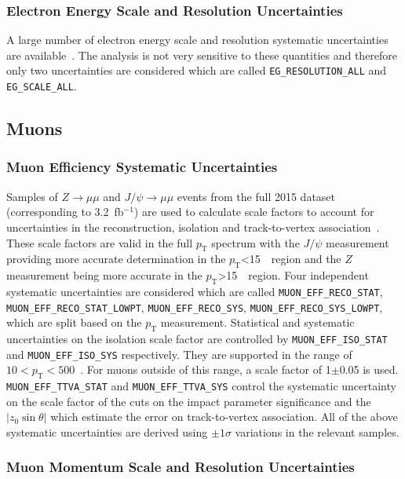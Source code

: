 \subsubsection{Electron Energy Scale and Resolution Uncertainties}

A large number of electron energy scale and resolution systematic uncertainties
are available~\cite{EgammaCalibTWiki}. The analysis is not very sensitive to
these quantities and therefore only two uncertainties are considered which are
called \texttt{EG\_RESOLUTION\_ALL} and \texttt{EG\_SCALE\_ALL}.

\subsection{Muons}

\subsubsection{Muon Efficiency Systematic Uncertainties}

Samples of $Z\to\mu\mu$ and $J/\psi\to\mu\mu$ events from the full 2015
dataset (corresponding to 3.2~fb$^{-1}$) are used to calculate scale factors to
account for uncertainties in the reconstruction, isolation and track-to-vertex
association~\cite{muonTWiki}. These scale factors are valid in the full $p_{\mathrm{T}}$
spectrum with the $J/\psi$ measurement providing more accurate determination in
the $p_{\mathrm{T}}$<15~\GeV\ region and the $Z$ measurement being more accurate in the
$p_{\mathrm{T}}$>15~\GeV\ region. Four independent systematic uncertainties are considered
which are called \texttt{MUON\_EFF\_RECO\_STAT},
\texttt{MUON\_EFF\_RECO\_STAT\_LOWPT}, \texttt{MUON\_EFF\_RECO\_SYS},
\texttt{MUON\_EFF\_RECO\_SYS\_LOWPT}, which are split based on the
$p_{\mathrm{T}}$ measurement. Statistical and systematic uncertainties on the
isolation scale factor are controlled by \texttt{MUON\_EFF\_ISO\_STAT} and
\texttt{MUON\_EFF\_ISO\_SYS} respectively. They are supported in the range of
$10 < p_{\mathrm{T}} < 500$~\GeV. For muons outside of this range, a scale
factor of 1$\pm$0.05 is used. \texttt{MUON\_EFF\_TTVA\_STAT} and
\texttt{MUON\_EFF\_TTVA\_SYS} control the systematic uncertainty on the scale
factor of the cuts on the impact parameter significance and the
$|z_0\sin\theta|$ which estimate the error on track-to-vertex association. All
of the above systematic uncertainties are derived using $\pm 1\sigma$ variations
in the relevant samples.

\subsubsection{Muon Momentum Scale and Resolution Uncertainties}

